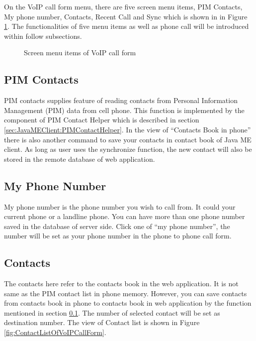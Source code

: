 On the VoIP call form menu, there are five screen menu items, PIM Contacts, My phone number, Contacts, Recent Call and Sync which is shown in in Figure \ref{fig:ScreenMenuItemsOfVoIPCallForm}. The functionalities of five menu items as well as phone call will be introduced within follow subsections.

\begin{figure}[!hbtp]
\centering
{}
\caption{Screen menu items of VoIP call form}
\label{fig:ScreenMenuItemsOfVoIPCallForm}
\end{figure}

\subsection{PIM Contacts}
\label{sec:JavaMEClient:UserInterface:PIMContacts}

PIM contacts supplies feature of reading contacts from Personal Information Management (PIM) data from cell phone. This function is implemented by the component of \textsf{PIM Contact Helper} which is described in section \ref{sec:JavaMEClient:PIMContactHelper}. In the view of ``Contacts Book in phone'' there is also another command to save your contacts in contact book of Java ME client. As long as user uses the synchronize function, the new contact will also be stored in the remote database of web application.

\subsection{My Phone Number}

My phone number is the phone number you wish to call from. It could your current phone or a landline phone. You can have more than one phone number saved in the database of server side. 
Click one of ``my phone number'', the number will be set as your phone number in the phone to phone call form.

\subsection{Contacts}

The contacts here refer to the contacts book in the web application. It is not same as the PIM contact list in phone memory. However, you can save contacts from contacts book in phone to contacts book in web application by the function mentioned in section \ref{sec:JavaMEClient:UserInterface:PIMContacts}. The number of selected contact will be set as destination number. The view of Contact list is shown in Figure \ref{fig:ContactListOfVoIPCallForm}.

